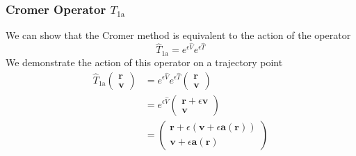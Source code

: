 \documentclass[8pt,a4paper]{article}
\begin{document}
	\subsubsection{Cromer Operator $T_\mathrm{1a}$}
	We can show that the Cromer method is equivalent to the action of the operator
	\begin{equation}
		\hat{T}_\mathrm{1a} = e^{\epsilon \hat{V}} e^{\epsilon \hat{T}}
	\end{equation}
	We demonstrate the action of this operator on a trajectory point
	\begin{align}
		\hat{T}_\mathrm{1a}
		\begin{pmatrix}
			\mathbf{r} \\ \mathbf{v}
		\end{pmatrix}
		&= e^{\epsilon \hat{V}} e^{\epsilon \hat{T}}
		\begin{pmatrix}
			\mathbf{r} \\ \mathbf{v}
		\end{pmatrix} \nonumber \\
		&= e^{\epsilon \hat{V}}
		\begin{pmatrix}
			\mathbf{r} + \epsilon \mathbf{v} \\ \mathbf{v}
		\end{pmatrix} \nonumber \\
		&=
		\begin{pmatrix}
			\mathbf{r} + \epsilon (\mathbf{v} + \epsilon\mathbf{a}(\mathbf{r}))\\
			\mathbf{v} + \epsilon\mathbf{a}(\mathbf{r})
		\end{pmatrix}
	\end{align}
	
\end{document}
